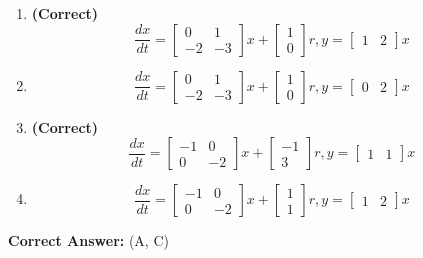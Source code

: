 \documentclass[11pt,a4paper]{article}
\begin{document}
\begin{enumerate}[label=(\Alph*)]
    \item \textbf{(Correct)} \[
\frac{d x}{d t}=\left[\begin{array}{cc}0 & 1 \\ -2 & -3\end{array}\right] x+\left[\begin{array}{l}1 \\ 0\end{array}\right] r, y=\left[\begin{array}{ll}1 & 2\end{array}\right] x
\]
    \item \[
\frac{d x}{d t}=\left[\begin{array}{cc}0 & 1 \\ -2 & -3\end{array}\right] x+\left[\begin{array}{l}1 \\ 0\end{array}\right] r, y=\left[\begin{array}{ll}0 & 2\end{array}\right] x
\]
    \item \textbf{(Correct)} \[
\frac{d x}{d t}=\left[\begin{array}{cc}-1 & 0 \\ 0 & -2\end{array}\right] x+\left[\begin{array}{c}-1 \\ 3\end{array}\right] r, y=\left[\begin{array}{ll}1 & 1\end{array}\right] x
\]
    \item \[
\frac{d x}{d t}=\left[\begin{array}{cc}-1 & 0 \\ 0 & -2\end{array}\right] x+\left[\begin{array}{l}1 \\ 1\end{array}\right] r, y=\left[\begin{array}{ll}1 & 2\end{array}\right] x
\]
\end{enumerate}

\noindent \textbf{Correct Answer:} (A, C)
\end{document}
